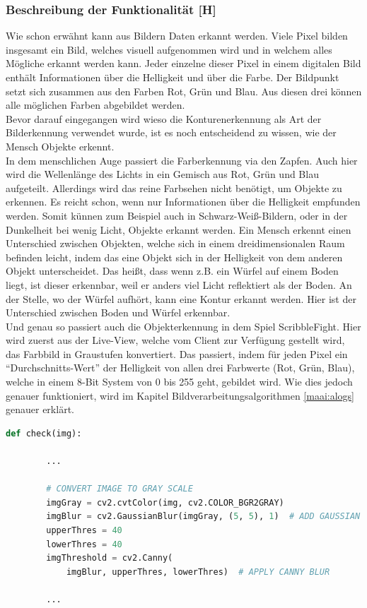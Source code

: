 \subsubsection{Beschreibung der Funktionalität [H]}\label{maai:beschrFunktionalitaet}

Wie schon erwähnt kann aus Bildern Daten erkannt werden. Viele Pixel bilden insgesamt ein Bild, welches visuell aufgenommen wird und in welchem alles Mögliche erkannt werden kann. Jeder einzelne dieser Pixel in einem digitalen Bild enthält Informationen über die Helligkeit und über die Farbe. Der Bildpunkt setzt sich zusammen aus den Farben Rot, Grün und Blau. Aus diesen drei können alle möglichen Farben abgebildet werden.
\\
Bevor darauf eingegangen wird wieso die Konturenerkennung als Art der Bilderkennung verwendet wurde, ist es noch entscheidend zu wissen, wie der Mensch Objekte erkennt.
\\
In dem menschlichen Auge passiert die Farberkennung via den Zapfen. Auch hier wird die Wellenlänge des Lichts in ein Gemisch aus Rot, Grün und Blau aufgeteilt. Allerdings wird das reine Farbsehen nicht benötigt, um Objekte zu erkennen. Es reicht schon, wenn nur Informationen über die Helligkeit empfunden werden. Somit künnen zum Beispiel auch in Schwarz-Weiß-Bildern, oder in der Dunkelheit bei wenig Licht, Objekte erkannt werden. Ein Mensch erkennt einen Unterschied zwischen Objekten, welche sich in einem dreidimensionalen Raum befinden leicht, indem das eine Objekt sich in der Helligkeit von dem anderen Objekt unterscheidet. Das heißt, dass wenn z.B. ein Würfel auf einem Boden liegt, ist dieser erkennbar, weil er anders viel Licht reflektiert als der Boden. An der Stelle, wo der Würfel aufhört, kann eine Kontur erkannt werden. Hier ist der Unterschied zwischen Boden und Würfel erkennbar.
\\
Und genau so passiert auch die Objekterkennung in dem Spiel ScribbleFight. Hier wird zuerst aus der Live-View, welche vom Client zur Verfügung gestellt wird, das Farbbild in Graustufen konvertiert. Das passiert, indem für jeden Pixel ein ``Durchschnitts-Wert'' der Helligkeit von allen drei Farbwerte (Rot, Grün, Blau), welche in einem 8-Bit System von 0 bis 255 geht, gebildet wird. Wie dies jedoch genauer funktioniert, wird im Kapitel Bildverarbeitungsalgorithmen
\ref{maai:alogs}
genauer erklärt.

\begin{lstlisting}[caption=Alle unnötigen Bilddaten entfernen,language=Python,label=lst:impl:filters]
    def check(img):
        
        ...

        # CONVERT IMAGE TO GRAY SCALE
        imgGray = cv2.cvtColor(img, cv2.COLOR_BGR2GRAY)
        imgBlur = cv2.GaussianBlur(imgGray, (5, 5), 1)  # ADD GAUSSIAN BLUR
        upperThres = 40
        lowerThres = 40
        imgThreshold = cv2.Canny(
            imgBlur, upperThres, lowerThres)  # APPLY CANNY BLUR
        
        ...
\end{lstlisting}


